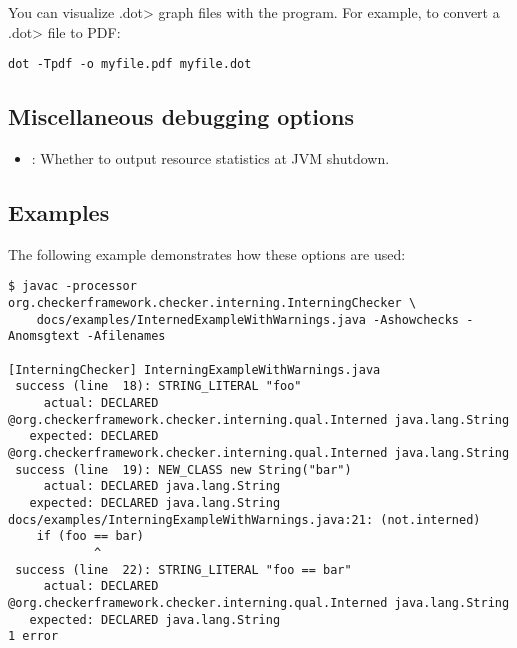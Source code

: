 You can visualize \<.dot> graph files with the  program.  For
example, to convert a \<.dot> file to PDF:

\begin{Verbatim}
dot -Tpdf -o myfile.pdf myfile.dot
\end{Verbatim}

\subsection{Miscellaneous debugging options\label{creating-debugging-options-misc}}

\begin{itemize}

\item {}:
  Whether to output resource statistics at JVM shutdown.

\end{itemize}


\subsection{Examples\label{creating-debugging-options-examples}}

The following example demonstrates how these options are used:

\begin{smaller}
\begin{Verbatim}
$ javac -processor org.checkerframework.checker.interning.InterningChecker \
    docs/examples/InternedExampleWithWarnings.java -Ashowchecks -Anomsgtext -Afilenames

[InterningChecker] InterningExampleWithWarnings.java
 success (line  18): STRING_LITERAL "foo"
     actual: DECLARED @org.checkerframework.checker.interning.qual.Interned java.lang.String
   expected: DECLARED @org.checkerframework.checker.interning.qual.Interned java.lang.String
 success (line  19): NEW_CLASS new String("bar")
     actual: DECLARED java.lang.String
   expected: DECLARED java.lang.String
docs/examples/InterningExampleWithWarnings.java:21: (not.interned)
    if (foo == bar)
            ^
 success (line  22): STRING_LITERAL "foo == bar"
     actual: DECLARED @org.checkerframework.checker.interning.qual.Interned java.lang.String
   expected: DECLARED java.lang.String
1 error
\end{Verbatim}
\end{smaller}

